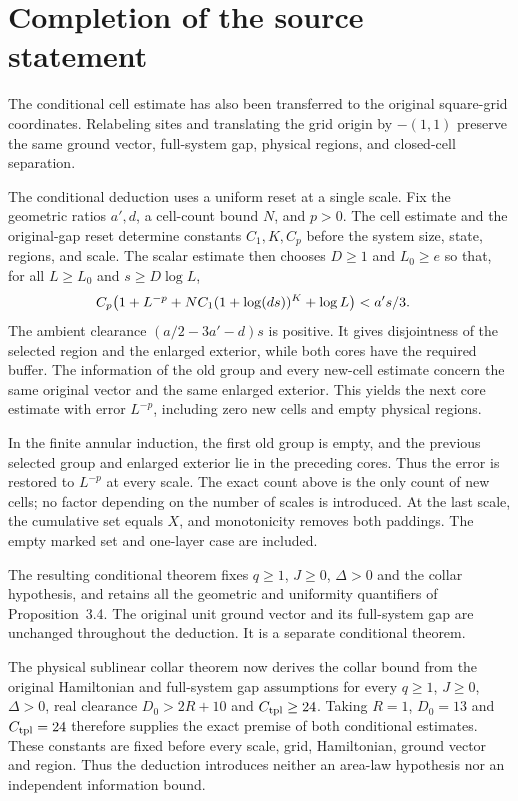 \documentclass{article}
\begin{document}
\section{Completion of the source statement}

The conditional cell estimate has also been transferred to the original
square-grid coordinates. Relabeling sites and translating the grid origin
by $-(1,1)$ preserve the same ground vector, full-system gap, physical
regions, and closed-cell separation.

The conditional deduction uses a uniform reset at a single scale.
Fix the geometric ratios $a',d$, a cell-count bound $N$, and $p>0$.
The cell estimate and the original-gap reset determine constants
$C_1,K,C_p$ before the system size, state, regions, and scale.
The scalar estimate then chooses $D\ge1$ and $L_0\ge e$ so that, for
all $L\ge L_0$ and $s\ge D\log L$,
\begin{align}
    C_p\bigl(1+L^{-p}+NC_1(1+\log(ds))^K+\log L\bigr)
     & < a's/3.
    \notag
\end{align}
The ambient clearance $(a/2-3a'-d)s$ is positive. It gives disjointness
of the selected region and the enlarged exterior, while both cores have
the required buffer. The information of the old group and every new-cell
estimate concern the same original vector and the same enlarged exterior.
This yields the next core estimate with error $L^{-p}$, including zero
new cells and empty physical regions.

In the finite annular induction, the first old group is empty, and the
previous selected group and enlarged exterior lie in the preceding cores.
Thus the error is restored to $L^{-p}$ at every scale. The exact count
above is the only count of new cells; no factor depending on the number
of scales is introduced. At the last scale, the cumulative set equals
$X$, and monotonicity removes both paddings. The empty marked set and
one-layer case are included.

The resulting conditional theorem fixes $q\ge1$, $J\ge0$, $\Delta>0$
and the collar hypothesis, and retains all the geometric and uniformity
quantifiers of Proposition~3.4. The original unit ground vector and its
full-system gap are unchanged throughout the deduction. It is a separate
conditional theorem.

The physical sublinear collar theorem now derives the collar bound from
the original Hamiltonian and full-system gap assumptions for every
$q\ge1$, $J\ge0$, $\Delta>0$, real clearance $D_0>2R+10$ and
$C_{\rm tpl}\ge24$. Taking $R=1$, $D_0=13$ and $C_{\rm tpl}=24$ therefore
supplies the exact premise of both conditional estimates. These constants
are fixed before every scale, grid, Hamiltonian, ground vector and region.
Thus the deduction introduces neither an area-law hypothesis nor an
independent information bound.
\end{document}
